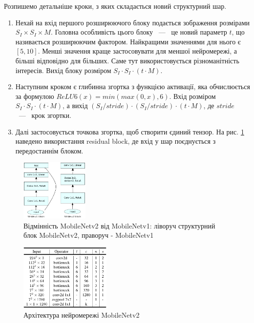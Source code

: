Розпишемо детальніше кроки, з яких складається новий структурний шар.
\begin{enumerate}
    \item Нехай на вхід першого розширюючого блоку подається зображення розмірами $S_I \times S_I \times M$.
          Головна особливість цього блоку ~---~ це новий параметр $t$, що називається розширюючим фактором.
          Найкращими значеннями для нього є $[5,10]$. Менші значення краще застосовувати для меншої нейромережі,
          а більші відповідно для більших. Саме тут використовується різноманітність інтересів.
          Вихід блоку розміром $S_I \cdot  S_I \cdot  (t\cdot M)$.
    \item Наступним кроком є глибинна згортка з функцією активації,
          яка обчислюється за формулою $ReLU6(x) =  min(max(0,x),6)$.
          Вхід розміром $S_I \cdot  S_I \cdot  (t\cdot M)$, а вихід $(S_I/stride) \cdot  (S_I/stride) \cdot  (t\cdot M)$,
          де  $stride$ ~---~ крок згортки.
    \item Далі застосовується точкова згортка, щоб створити єдиний тензор. На
          рис. \ref{fig:cnn:mobilenetv2_layer} наведено використання residual block, де вхід у шар
          поєднується з передостаннім блоком.
\end{enumerate}
\begin{figure}[H]
    \centering
    \includegraphics[width=0.3\textwidth]{images/cnn_mobilenetv2_layer}
    \caption{Відмінність MobileNetv2 від MobileNetv1: ліворуч структурний блок MobileNetv2,
        праворуч - MobileNetv1   \cite{bib:mobilenet:v2}
        \label{fig:cnn:mobilenetv2_layer}
    }
\end{figure}

\begin{figure}[H]
    \centering
    \includegraphics[width=0.4\textwidth]{images/cnn_mobilenetv2_architecture}
    \caption{Архітектура нейромережі MobileNetv2     \cite{bib:mobilenet:v2}
        \label{fig:cnn:mobilenetv2_architecture}
    }
\end{figure}

